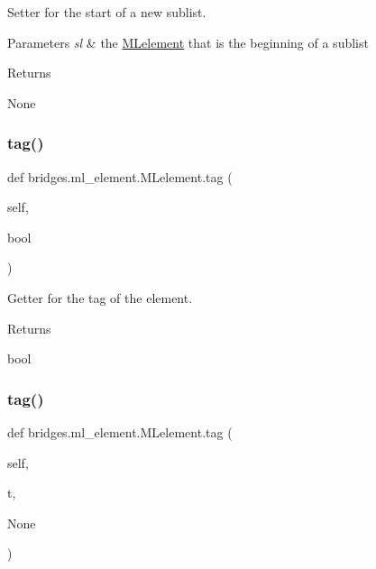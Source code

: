 Setter for the start of a new sublist. 


\begin{DoxyParams}{Parameters}
{\em sl} & the \mbox{\hyperlink{classbridges_1_1ml__element_1_1_m_lelement}{M\+Lelement}} that is the beginning of a sublist \\
\hline
\end{DoxyParams}
\begin{DoxyReturn}{Returns}


None 
\end{DoxyReturn}
\mbox{\label{classbridges_1_1ml__element_1_1_m_lelement_a805f6b6f24ec9c5518c298320742a8d6}} 
\subsubsection{\texorpdfstring{tag()}{tag()}\hspace{0.1cm}{\footnotesize\ttfamily [1/2]}}
{\footnotesize\ttfamily def bridges.\+ml\+\_\+element.\+M\+Lelement.\+tag (\begin{DoxyParamCaption}\item[{}]{self,  }\item[{}]{bool }\end{DoxyParamCaption})}



Getter for the tag of the element. 

\begin{DoxyReturn}{Returns}


bool 
\end{DoxyReturn}
\mbox{\label{classbridges_1_1ml__element_1_1_m_lelement_aaae13135b666038dee8a843cd32b03b1}} 
\subsubsection{\texorpdfstring{tag()}{tag()}\hspace{0.1cm}{\footnotesize\ttfamily [2/2]}}
{\footnotesize\ttfamily def bridges.\+ml\+\_\+element.\+M\+Lelement.\+tag (\begin{DoxyParamCaption}\item[{}]{self,  }\item[{}]{t,  }\item[{}]{None }\end{DoxyParamCaption})}



